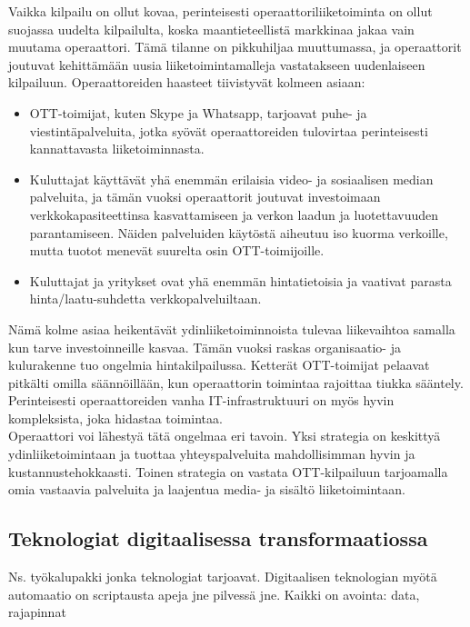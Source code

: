 \documentclass[finnish,12pt,a4paper,pdftex]{article}
\begin{document}
Vaikka kilpailu on ollut kovaa, perinteisesti operaattoriliiketoiminta on ollut suojassa uudelta kilpailulta, koska maantieteellistä markkinaa jakaa vain muutama operaattori. Tämä tilanne on pikkuhiljaa muuttumassa, ja operaattorit joutuvat kehittämään uusia liiketoimintamalleja vastatakseen uudenlaiseen kilpailuun. Operaattoreiden haasteet tiivistyvät kolmeen asiaan: \citep{inderes}
\begin{itemize}
    \item[] OTT-toimijat, kuten Skype ja Whatsapp, tarjoavat puhe- ja viestintäpalveluita, jotka syövät operaattoreiden tulovirtaa perinteisesti kannattavasta liiketoiminnasta.
    \item[] Kuluttajat käyttävät yhä enemmän erilaisia video- ja sosiaalisen median palveluita, ja tämän vuoksi operaattorit joutuvat investoimaan verkkokapasiteettinsa kasvattamiseen ja verkon laadun ja luotettavuuden parantamiseen. Näiden palveluiden käytöstä aiheutuu iso kuorma verkoille, mutta tuotot menevät suurelta osin OTT-toimijoille.
    \item[] Kuluttajat ja yritykset ovat yhä enemmän hintatietoisia ja vaativat parasta hinta/laatu-suhdetta verkkopalveluiltaan.
\end{itemize}

Nämä kolme asiaa heikentävät ydinliiketoiminnoista tulevaa liikevaihtoa samalla kun tarve investoinneille kasvaa. Tämän vuoksi raskas organisaatio- ja kulurakenne tuo ongelmia hintakilpailussa. Ketterät OTT-toimijat pelaavat pitkälti omilla säännöillään, kun operaattorin toimintaa rajoittaa tiukka sääntely. Perinteisesti operaattoreiden vanha IT-infrastruktuuri on myös hyvin kompleksista, joka hidastaa toimintaa. \citep{inderes}\\

Operaattori voi lähestyä tätä ongelmaa eri tavoin. Yksi strategia on keskittyä ydinliiketoimintaan ja tuottaa yhteyspalveluita mahdollisimman hyvin ja kustannustehokkaasti. Toinen strategia on vastata OTT-kilpailuun tarjoamalla omia vastaavia palveluita ja laajentua media- ja sisältö liiketoimintaan. \citep{inderes}


\subsection{Teknologiat digitaalisessa transformaatiossa}
Ns. työkalupakki jonka teknologiat tarjoavat.
Digitaalisen teknologian myötä automaatio on scriptausta apeja jne pilvessä jne. Kaikki on avointa: data, rajapinnat
\end{document}

